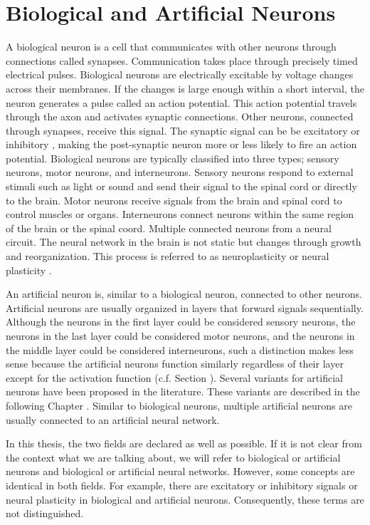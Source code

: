 \section{Biological and Artificial Neurons}
A biological neuron is a cell that communicates with other neurons through connections called synapses.
Communication takes place through precisely timed electrical pulses.
Biological neurons are electrically excitable by voltage changes across their membranes.
If the changes is large enough within a short interval, the neuron generates a pulse called an action potential.
This action potential travels through the axon and activates synaptic connections.
Other neurons, connected through synapses, receive this signal.
The synaptic signal can be be excitatory  or inhibitory , making the post-synaptic neuron more or less likely to fire an action potential.
Biological neurons are typically classified into three types; sensory neurons, motor neurons, and interneurons.
Sensory neurons respond to external stimuli such as light or sound and send their signal to the spinal cord or directly to the brain.
Motor neurons receive signals from the brain and spinal cord to control muscles or organs.
Interneurons connect neurons within the same region of the brain or the spinal coord.
Multiple connected neurons from a neural circuit.
The neural network in the brain is not static but changes through growth and reorganization.
This process is referred to as neuroplasticity or neural plasticity .

An artificial neuron is, similar to a biological neuron, connected to other neurons.
Artificial neurons are usually organized in layers that forward signals sequentially.
Although the neurons in the first layer could be considered sensory neurons, the neurons in the last layer could be considered motor neurons, and the neurons in the middle layer could be considered interneurons, such a distinction makes less sense because the artificial neurons function similarly regardless of their layer except for the activation function (c.f. Section ).
Several variants for artificial neurons have been proposed in the literature. These variants are described in the following Chapter .
Similar to biological neurons, multiple artificial neurons are usually connected to an artificial neural network.

In this thesis, the two fields are declared as well as possible.
If it is not clear from the context what we are talking about, we will refer to biological or artificial neurons and biological or artificial neural networks.
However, some concepts are identical in both fields.
For example, there are excitatory or inhibitory signals or neural plasticity in biological and artificial neurons.
Consequently, these terms are not distinguished.


